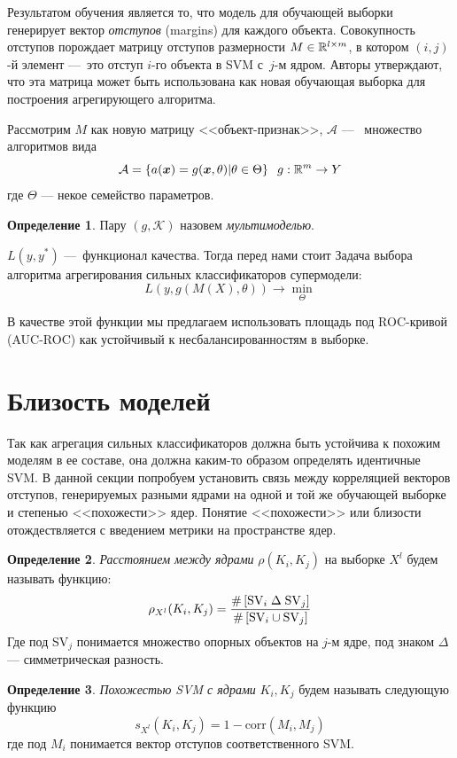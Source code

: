 \documentclass[12pt,twoside]{article}
\theoremstyle{plain}
\theoremstyle{remark}
\theoremstyle{definition}
\newtheorem{df}{Определение}[section]
\begin{document}
Результатом обучения является то, что модель для обучающей выборки генерирует вектор \emph{отступов} (margins) для каждого объекта. Совокупность отступов порождает матрицу отступов  размерности
$M \in \R^{l\times m}$,
в котором $(i, j)$-й элемент ---~это отступ $i$-го объекта в SVM с~$j$-м ядром. Авторы утверждают, что эта матрица может быть использована как новая обучающая выборка для построения агрегирующего алгоритма.

Рассмотрим $M$ как новую матрицу <<объект-признак>>, $\mathcal{A}$ ---~ множество алгоритмов
вида
\begin{equation}
    \mathcal{A} = \left\{a(\boldsymbol{x}) = g(\boldsymbol{x}, \theta)|\theta \in \Theta\right\}\;\; g:\mathbb{R}^m \to Y
\end{equation}
где $\Theta$ --- некое семейство параметров.
\begin{df}
Пару $(g, \mathcal{K})$ назовем \emph{мультимоделью}.
\end{df}

$L(y, y^*)$ ---~функционал качества. Тогда перед нами стоит 
Задача выбора алгоритма агрегирования сильных классификаторов супермодели:
	\begin{equation}
    	L(y, g(M(X), \theta)) \to \min_{\Theta}
	\end{equation}

В качестве этой функции мы предлагаем использовать площадь под ROC-кривой (AUC-ROC) как устойчивый к несбалансированностям в выборке.
\section{Близость моделей}

Так как агрегация сильных классификаторов должна быть устойчива к похожим моделям в ее составе, она должна каким-то образом определять идентичные SVM. В данной секции попробуем установить связь между корреляцией векторов отступов,
генерируемых
разными ядрами на одной и той же обучающей выборке и степенью <<похожести>>
ядер. Понятие <<похожести>> или близости отождествляется с введением метрики
на пространстве ядер. 
\begin{df}
	\emph{Расстоянием между ядрами} $\rho(K_i, K_j)$ на выборке $X^l$ будем называть функцию:
$$
\rho_{X^l}(K_i, K_j) = \frac{\#\left[\mathrm{SV}_i \;\Delta\; \mathrm{SV}_j\right]}
{\#\left[\mathrm{SV}_i \cup \mathrm{SV}_j\right]}
$$
Где под $\mathrm{SV}_j$ понимается множество опорных объектов на $j$-м ядре, под
знаком $\Delta$ --- симметрическая разность.
\end{df}
\begin{df}
	\emph{Похожестью SVM с ядрами} $K_i, K_j$ будем называть следующую функцию
$$
s_{X^l}(K_i, K_j) = 1 - \mathrm{corr}(M_i, M_j)
$$	
где под $M_i$ понимается вектор отступов соответственного SVM. 
\end{df}
\end{document}
